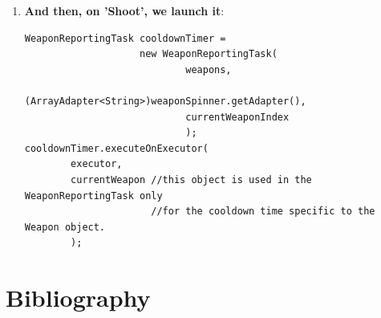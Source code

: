 \documentclass{article}
\begin{document}
\begin{enumerate}
\begin{verbatim}
 			try {
				Thread.sleep(200);
			} catch (InterruptedException e) {
				// TODO Auto-generated catch block
				e.printStackTrace();
			}
 			
 			secondsElapsed = 
 					(int) MapUtils.getTimeDelta(weapon.getLastUsed(), true);
 		}
 		
 		return 1;
 	}
     
    
    protected synchronized void onProgressUpdate(Integer... progress) {
    	
    	if(progress != null)
    		weaponsArray.set(
    			selectedIndex, 
    			initialWeaponName+" ("+progress[0].toString()+" )"
    			);
    	
    	else 
    		weaponsArray.set(
    			selectedIndex, 
    			initialWeaponName
    			);
    	
    	dataAdapter.notifyDataSetChanged();
    }

    
    @Override
    protected void onPostExecute(Integer result) {
    	weaponsArray.set(selectedIndex, initialWeaponName);
    	dataAdapter.notifyDataSetChanged();    	
    	super.onPostExecute(result);
    	
    	hasFinished = true;
    	
    }
    
    @Override
    protected void onCancelled() {
    	weaponsArray.set(selectedIndex, initialWeaponName);
    	dataAdapter.notifyDataSetChanged();
    	super.onCancelled();
    	
    	hasFinished = true;
    }



	public boolean hasFinished() {
		return hasFinished;
	}
    
}

\end{verbatim}

  \item \textbf{And then, on 'Shoot', we launch it}:

\begin{verbatim}
WeaponReportingTask cooldownTimer = 
					new WeaponReportingTask(
							weapons,
							(ArrayAdapter<String>)weaponSpinner.getAdapter(),
							currentWeaponIndex
							);
cooldownTimer.executeOnExecutor(
		executor,
		currentWeapon //this object is used in the WeaponReportingTask only  
					  //for the cooldown time specific to the Weapon object.
		);
\end{verbatim}


\end{enumerate}






\section{Bibliography}
		
	
\end{document}
